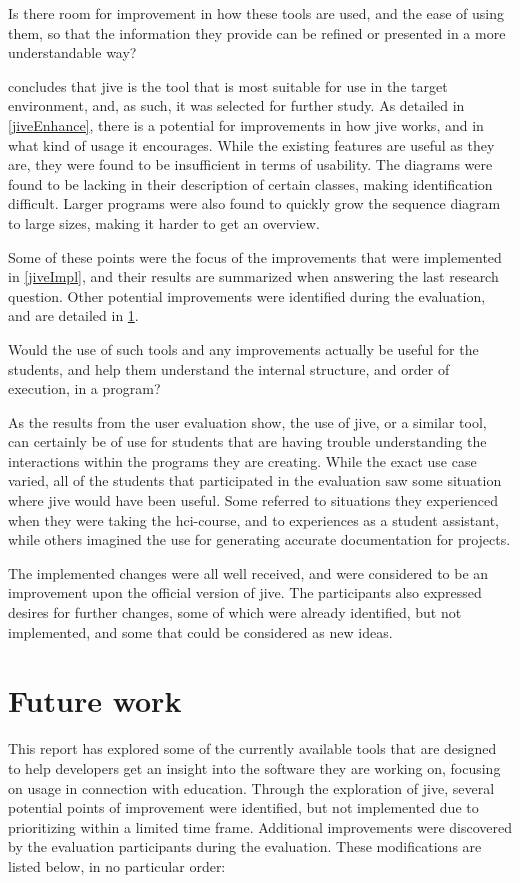 \begin{theorem}
Is there room for improvement in how these tools are used, and the ease of using them, so that the information they provide can be refined or presented in a more understandable way?
\end{theorem}
 concludes that \gls{jive} is the tool that is most suitable for use in the target environment, and, as such, it was selected for further study.
As detailed in \cref{jiveEnhance}, there is a potential for improvements in how \gls{jive} works, and in what kind of usage it encourages.
While the existing features are useful as they are, they were found to be insufficient in terms of usability.
The diagrams were found to be lacking in their description of certain classes, making identification difficult.
Larger programs were also found to quickly grow the sequence diagram to large sizes, making it harder to get an overview.

Some of these points were the focus of the improvements that were implemented in \cref{jiveImpl}, and their results are summarized when answering the last research question.
Other potential improvements were identified during the evaluation, and are detailed in \cref{conclusionFuture}.

\begin{theorem}
Would the use of such tools and any improvements actually be useful for the students, and help them understand the internal structure, and order of execution, in a program?
\end{theorem}
As the results from the user evaluation show, the use of \gls{jive}, or a similar tool, can certainly be of use for students that are having trouble understanding the interactions within the programs they are creating.
While the exact use case varied, all of the students that participated in the evaluation saw some situation where \gls{jive} would have been useful.
Some referred to situations they experienced when they were taking the \gls{hci}-course, and to experiences as a student assistant, while others imagined the use for generating accurate documentation for projects.

The implemented changes were all well received, and were considered to be an improvement upon the official version of \gls{jive}.
The participants also expressed desires for further changes, some of which were already identified, but not implemented, and some that could be considered as new ideas.

\section{Future work}\label{conclusionFuture}
This report has explored some of the currently available tools that are designed to help developers get an insight into the software they are working on, focusing on usage in connection with education.
Through the exploration of \gls{jive}, several potential points of improvement were identified, but not implemented due to prioritizing within a limited time frame.
Additional improvements were discovered by the evaluation participants during the evaluation.
These modifications are listed below, in no particular order:

